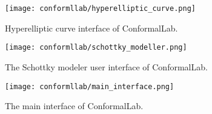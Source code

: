 \documentclass[Thesis.tex]{subfiles}
\begin{document}
\begin{wrapfigure}{R}{0.4\textwidth}
\centering
\texttt{[image: conformllab/hyperelliptic\_curve.png]}
\caption{Hyperelliptic curve interface of {\sc ConformalLab}.}
\label{fig:conformal_hyperelliptic}
\end{wrapfigure}

\begin{wrapfigure}{R}{0.4\textwidth}
\centering
\texttt{[image: conformllab/schottky\_modeller.png]}
\caption{The Schottky modeler user interface of {\sc ConformalLab}.}
\label{fig:conformal_schottky}
\end{wrapfigure}

\begin{wrapfigure}{R}{0.3\textwidth}
\centering
\texttt{[image: conformllab/main\_interface.png]}
\caption{The main interface of {\sc ConformalLab}.}
\label{fig:conformal_main}
\end{wrapfigure}



\subfilebibliography
\end{document}
